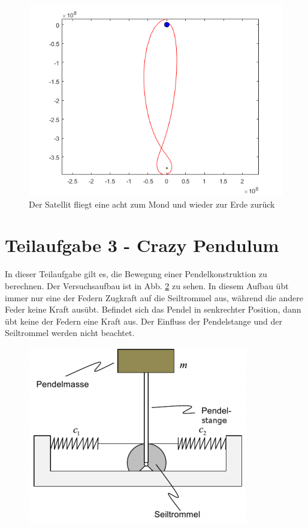 \documentclass[]{scrartcl}
\begin{document}
\begin{figure}[H]
\centering
\includegraphics[width=1\linewidth]{./2_MondErdeAcht}
\caption{Der Satellit fliegt eine acht zum Mond und wieder zur Erde zurück}
\label{fig:2_MondErdeAcht}
\end{figure}

\section{Teilaufgabe 3 - Crazy Pendulum}
In dieser Teilaufgabe gilt es, die Bewegung einer Pendelkonstruktion zu berechnen. Der Versuchsaufbau ist in Abb. \ref{fig:3_Versuchsaufbau} zu sehen. In diesem Aufbau übt immer nur eine der Federn Zugkraft auf die Seiltrommel aus, während die andere Feder keine Kraft ausübt. Befindet sich das Pendel in senkrechter Position, dann übt keine der Federn eine Kraft aus. Der Einfluss der Pendelstange und der Seiltrommel werden nicht beachtet.

\begin{figure}[H]
\centering
\includegraphics[width=0.5\linewidth]{./3_Versuchsaufbau}
\caption{}
\label{fig:3_Versuchsaufbau}
\end{figure}
\end{document}
